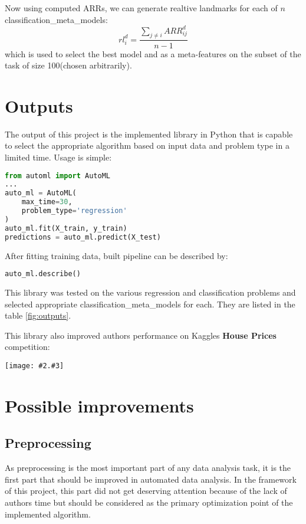 \documentclass[hidelinks, english]{mvi-report}
\newcommand{\smplimage}[3][1]{
\centerline{
    \texttt{[image: \#2.\#3]}
}
}
\begin{document}
Now using computed ARRs, we can generate realtive landmarks for each of $n$ classification_meta_models:
$$ rl^d_i = \dfrac{\sum_{j \neq i}ARR^d_{ij}}{n - 1} $$
which is used to select the best model and as a meta-features on the subset of the task of size 100(chosen arbitrarily).


\section{Outputs}
The output of this project is the implemented library in Python that is capable to select the appropriate algorithm
based on input data and problem type in a limited time. Usage is simple:

\vspace{0.5cm}
\begin{lstlisting}[language=Python]
from automl import AutoML
...
auto_ml = AutoML(
    max_time=30,
    problem_type='regression'
)
auto_ml.fit(X_train, y_train)
predictions = auto_ml.predict(X_test)

\end{lstlisting}
\vspace{0.5cm}

After fitting training data, built pipeline can be described by:
\vspace{0.5cm}
\begin{lstlisting}[language=Python]
auto_ml.describe()
\end{lstlisting}
\vspace{0.5cm}


This library was tested on the various regression and
classification problems and selected appropriate classification_meta_models for each. They are listed in the table  \ref{fig:outputs}.

This library also improved authors performance on Kaggles \textbf{House Prices} competition:

\vspace{0.5cm}

\smplimage[0.5]{kaggle}{png}


\section{Possible improvements}

\subsection{Preprocessing}
As preprocessing is the most important part of any data analysis task\cite{ten-quick-tips}, it is the first part that
should be improved in automated data analysis. In the framework of this project, this part did not get deserving attention
because of the lack of authors time but should be considered as the primary optimization point of the implemented
algorithm.
\end{document}

